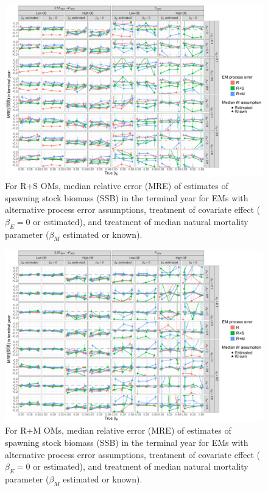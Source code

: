 \documentclass[
  12pt,
]{article}
\begin{document}
\begin{landscape}
\begin{figure}
\begin{center}
\includegraphics[height = \textheight]{terminal_year_ssb_bias_RSom}
\end{center}
\caption{For R+S OMs, median relative error (MRE) of estimates of spawning stock biomass (SSB) in the terminal year for EMs with alternative process error assumptions, treatment of covariate effect ($\beta_E = 0$ or estimated), and treatment of median natural mortality parameter ($\beta_M$ estimated or known).}\label{terminal_ssb_bias_RSom}
\end{figure}
\end{landscape}

\begin{landscape}
\begin{figure}
\begin{center}
\includegraphics[height = \textheight]{terminal_year_ssb_bias_RMom}
\end{center}
\caption{For R+M OMs, median relative error (MRE) of estimates of spawning stock biomass (SSB) in the terminal year for EMs with alternative process error assumptions, treatment of covariate effect ($\beta_E = 0$ or estimated), and treatment of median natural mortality parameter ($\beta_M$ estimated or known).}\label{terminal_ssb_bias_RMom}
\end{figure}
\end{landscape}
\end{document}
